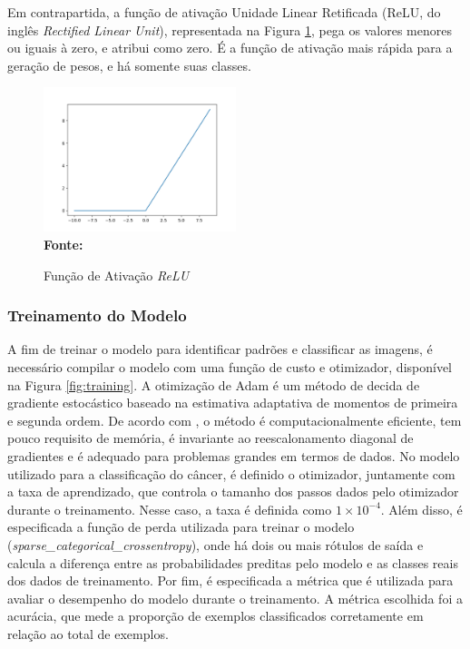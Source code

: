 Em contrapartida, a função de ativação Unidade Linear Retificada (ReLU, do inglês \textit{Rectified Linear Unit}), representada na Figura \ref{fig:relu}, pega os valores menores ou iguais à zero, e atribui como zero. É a função de ativação mais rápida para a geração de pesos, e há somente suas classes.

\begin{figure}[ht]
 	\centering	
 	\caption[\hspace{0.1cm}Grade Computacional.]{Função de Ativação \textit{ReLU}}
 	\vspace{-0.4cm}
 	\includegraphics[width=0.5\textwidth]{figuras/relu.png}
 	\captionsetup{justification=centering}
	\vspace{-0.2cm}
     \\\textbf{\footnotesize Fonte: \cite{relu}}
	\label{fig:relu}
\end{figure}



\subsubsection{\esp Treinamento do Modelo} \label{treinamento}

A fim de treinar o modelo para identificar padrões e classificar as imagens, é necessário compilar o modelo com uma função de custo e otimizador, disponível na Figura \ref{fig:training}. A otimização de Adam é um método de decida de gradiente estocástico baseado na estimativa adaptativa de momentos de primeira e segunda ordem. De acordo com , o método é computacionalmente eficiente, tem pouco requisito de memória, é invariante ao reescalonamento diagonal de gradientes e é adequado para problemas grandes em termos de dados. No modelo utilizado para a classificação do câncer, é definido o otimizador, juntamente com a taxa de aprendizado, que controla o tamanho dos passos dados pelo otimizador durante o treinamento. Nesse caso, a taxa é definida como \ensuremath{1 \times 10^{-4}}. Além disso, é especificada a função de perda utilizada para treinar o modelo (\textit{sparse\_categorical\_crossentropy}), onde há dois ou mais rótulos de saída e calcula a diferença entre as probabilidades preditas pelo modelo e as classes reais dos dados de treinamento. Por fim, é especificada a métrica que é utilizada para avaliar o desempenho do modelo durante o treinamento. A métrica escolhida foi a acurácia, que mede a proporção de exemplos classificados corretamente em relação ao total de exemplos. 

